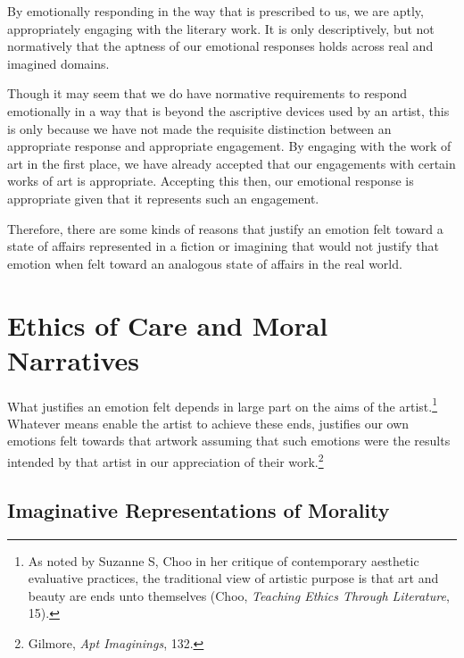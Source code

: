 \documentclass[phdthesis,12pt,final]{wuthesis}
\theoremstyle{definition}
\theoremstyle{definition}
\theoremstyle{definition}
\theoremstyle{definition}
\theoremstyle{remark}
\begin{document}
By emotionally responding in the way that is prescribed to us, we are aptly, appropriately engaging with the literary work. It is only descriptively, but not normatively that the aptness of our emotional responses holds across real and imagined domains.

Though it may seem that we do have normative requirements to respond emotionally in a way that is beyond the ascriptive devices used by an artist, this is only because we have not made the requisite distinction between an appropriate response and appropriate engagement. By engaging with the work of art in the first place, we have already accepted that our engagements with certain works of art is appropriate. Accepting this then, our emotional response is appropriate given that it represents such an engagement.

Therefore, there are some kinds of reasons that justify an emotion felt toward a state of affairs represented in a fiction or imagining that would not justify that emotion when felt toward an analogous state of affairs in the real world.

\section{Ethics of Care and Moral Narratives}\label{ethics-of-care-and-moral-narratives}

What justifies an emotion felt depends in large part on the aims of the artist.\footnote{As noted by Suzanne S, Choo in her critique of contemporary aesthetic evaluative practices, the traditional view of artistic purpose is that art and beauty are ends unto themselves (Choo, \emph{Teaching Ethics Through Literature}, 15).} Whatever means enable the artist to achieve these ends, justifies our own emotions felt towards that artwork assuming that such emotions were the results intended by that artist in our appreciation of their work.\footnote{Gilmore, \emph{Apt {Imaginings}}, 132.}

\subsection*{Imaginative Representations of Morality}\label{imaginative-representations-of-morality}
\end{document}
